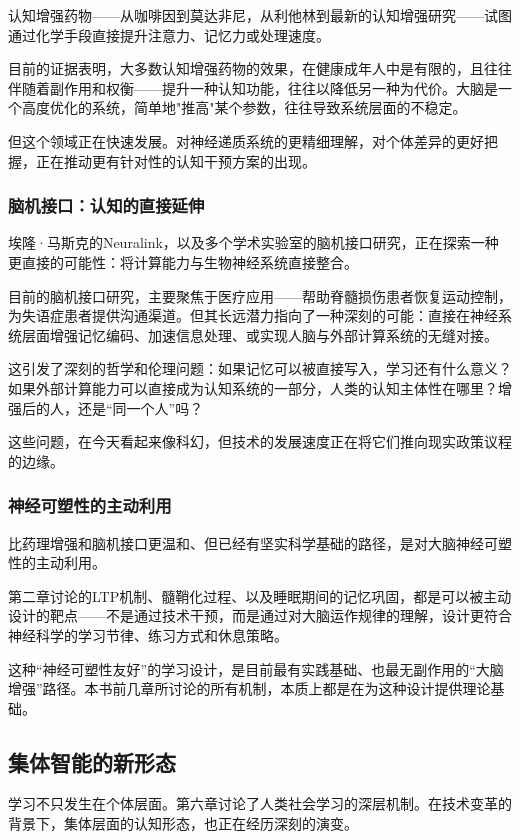 \documentclass[11pt]{article}
\begin{document}
认知增强药物——从咖啡因到莫达非尼，从利他林到最新的认知增强研究——试图通过化学手段直接提升注意力、记忆力或处理速度。

目前的证据表明，大多数认知增强药物的效果，在健康成年人中是有限的，且往往伴随着副作用和权衡——提升一种认知功能，往往以降低另一种为代价。大脑是一个高度优化的系统，简单地"推高"某个参数，往往导致系统层面的不稳定。

但这个领域正在快速发展。对神经递质系统的更精细理解，对个体差异的更好把握，正在推动更有针对性的认知干预方案的出现。
\subsubsection{脑机接口：认知的直接延伸}
\label{sec:org0d1fe79}

埃隆·马斯克的Neuralink，以及多个学术实验室的脑机接口研究，正在探索一种更直接的可能性：将计算能力与生物神经系统直接整合。

目前的脑机接口研究，主要聚焦于医疗应用——帮助脊髓损伤患者恢复运动控制，为失语症患者提供沟通渠道。但其长远潜力指向了一种深刻的可能：直接在神经系统层面增强记忆编码、加速信息处理、或实现人脑与外部计算系统的无缝对接。

这引发了深刻的哲学和伦理问题：如果记忆可以被直接写入，学习还有什么意义？如果外部计算能力可以直接成为认知系统的一部分，人类的认知主体性在哪里？增强后的人，还是“同一个人”吗？

这些问题，在今天看起来像科幻，但技术的发展速度正在将它们推向现实政策议程的边缘。
\subsubsection{神经可塑性的主动利用}
\label{sec:org2a05a45}

比药理增强和脑机接口更温和、但已经有坚实科学基础的路径，是对大脑神经可塑性的主动利用。

第二章讨论的LTP机制、髓鞘化过程、以及睡眠期间的记忆巩固，都是可以被主动设计的靶点——不是通过技术干预，而是通过对大脑运作规律的理解，设计更符合神经科学的学习节律、练习方式和休息策略。

这种“神经可塑性友好”的学习设计，是目前最有实践基础、也最无副作用的“大脑增强”路径。本书前几章所讨论的所有机制，本质上都是在为这种设计提供理论基础。
\subsection{集体智能的新形态}
\label{sec:orgea71d95}

学习不只发生在个体层面。第六章讨论了人类社会学习的深层机制。在技术变革的背景下，集体层面的认知形态，也正在经历深刻的演变。
\end{document}
